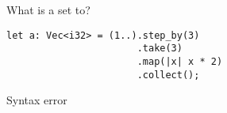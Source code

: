 %
%
  What is a set to?

  \begin{lstlisting}
let a: Vec<i32> = (1..).step_by(3)
                       .take(3)
                       .map(|x| x * 2)
                       .collect();
  \end{lstlisting}

  \choice {[2, 4, 6]}
  \choice Syntax error
  \choice {[4, 10, 16]}
  \choice {[2. 8, 14]}
